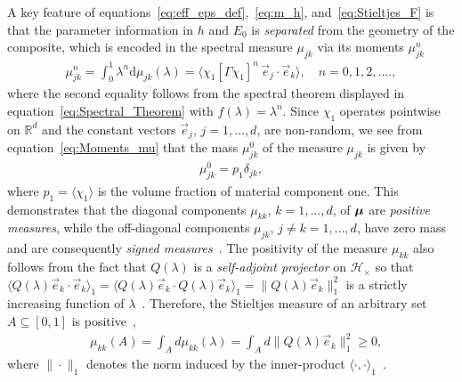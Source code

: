 \documentclass{cmslatex}
\renewcommand{\d}{\text{d}}
\newcommand\bmu{\mbox{\boldmath${\mu}$}}
\begin{document}
A key feature of equations~\eqref{eq:eff_eps_def},~\eqref{eq:m_h},
and~\eqref{eq:Stieltjes_F} is that the parameter information in $h$
and $E_0$ is \emph{separated} from the geometry of the composite, which is
encoded in the spectral measure $\mu_{jk}$ via its moments
$\mu_{jk}^n$~\cite{Golden:CMP-473,Bruno:JSP-365} 
%
\begin{align}\label{eq:Moments_mu}
  \mu_{jk}^n=\int_0^1\lambda^n\d\mu_{jk}(\lambda)       
       =\langle\chi_1[\Gamma \chi_1]^n\,\vec{e}_j\cdot\vec{e}_k\rangle,
  \quad n=0,1,2,\ldots.,
\end{align}
%
where the second equality follows from the spectral theorem displayed
in equation~\eqref{eq:Spectral_Theorem} with $f(\lambda)=\lambda^n$. Since $\chi_1$
operates pointwise on $\mathbb{R}^d$ and the constant vectors
$\vec{e}_j$, $j=1,\ldots,d$, are non-random, we see from
equation~\eqref{eq:Moments_mu} that the mass $\mu_{jk}^0$ of the measure 
$\mu_{jk}$ is given by
%
\begin{align}\label{eq:Measure_Mass_ConT}
  \mu_{jk}^0=p_1\delta_{jk},
\end{align}
%
where $p_1=\langle\chi_1\rangle$ is the volume fraction of material component
one. This demonstrates that the diagonal components $\mu_{kk}$,
$k=1,\ldots,d$, of $\bmu$ are \emph{positive measures}, 
while the off-diagonal components $\mu_{jk}$, $j\neq k=1,\ldots,d$, have 
zero mass and are consequently \emph{signed
  measures}~\cite{Folland:99,Rudin:87}. The positivity of the measure
$\mu_{kk}$ also 
follows from the fact that $Q(\lambda)$ is a \emph{self-adjoint projector}
on $\mathscr{H}_\times$ so that  $\langle Q(\lambda)\vec{e}_k\cdot\vec{e}_k\rangle_1=\langle Q(\lambda)\vec{e}_k\cdot
Q(\lambda)\vec{e}_k\rangle_1=\|Q(\lambda)\vec{e}_k\|_1^2$ is a strictly increasing 
function of $\lambda$~\cite{Stone:64}. Therefore, the Stieltjes measure of
an arbitrary set $A\subseteq[0,1]$ is positive~\cite{Folland:99},
% 
\begin{align}\label{eq:Mass_Sign_Measures}   
   &\mu_{kk}(A)=\int_Ad\mu_{kk}(\lambda)
           =\int_Ad\|Q(\lambda)\vec{e}_k\|_1^2\geq0,
\end{align}
%
where $\|\cdot\|_1$ denotes the norm induced by the inner-product
$\langle\cdot,\cdot\rangle_1$~\cite{Folland:99,Rudin:87}. 
\end{document}

